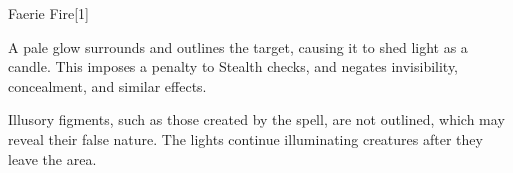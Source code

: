 \begin{spellsection}{Faerie Fire}[1]
    \begin{spellheader}
    \end{spellheader}
    \begin{spellcontent}
        \begin{spelltargetinginfo}
        \end{spelltargetinginfo}
        \begin{spelleffects}
            \spelleffect A pale glow surrounds and outlines the target, causing it to shed light as a candle. This imposes a  penalty to Stealth checks, and negates invisibility, concealment, and similar effects.
            \spelldur \durbrief
        \end{spelleffects}
    \end{spellcontent}
    \begin{spellfooter}
        \spellnotes Illusory figments, such as those created by the  spell, are not outlined, which may reveal their false nature. The lights continue illuminating creatures after they leave the area.
        \miscastyou
    \end{spellfooter}
    \begin{spellaugments}
    \end{spellaugments}
\end{spellsection}

